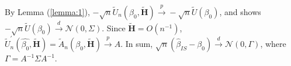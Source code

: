 \documentclass[titlepage,english,12pt]{article}
\begin{document}
	\noindent By Lemma (\ref{lemma:1}), $-\sqrt{n}\tilde{U}_n(\beta_0, \tilde{\textbf{H}}) \xrightarrow{p} -\sqrt{n}\tilde{U}(\beta_0)$, and \citet{kim2012censored} shows $-\sqrt{n}\tilde{U}(\beta_0) \xrightarrow{d} \mathcal{N}(0,\Sigma)$. Since $\tilde{\textbf{H}}=O(n^{-1})$, $\tilde{U}_n^{\prime}(\hat{\beta_0},\tilde{\textbf{H}})=\tilde{A}_n(\beta_0, \tilde{\textbf{H}}) \xrightarrow{p} A$. In sum,
	$\sqrt{n}(\hat{\beta}_{IS}-\beta_0) \xrightarrow{d} \mathcal{N}(0,\Gamma)$, where $\Gamma = A^{-1}\Sigma A^{-1}$.
	



	
\end{document}
